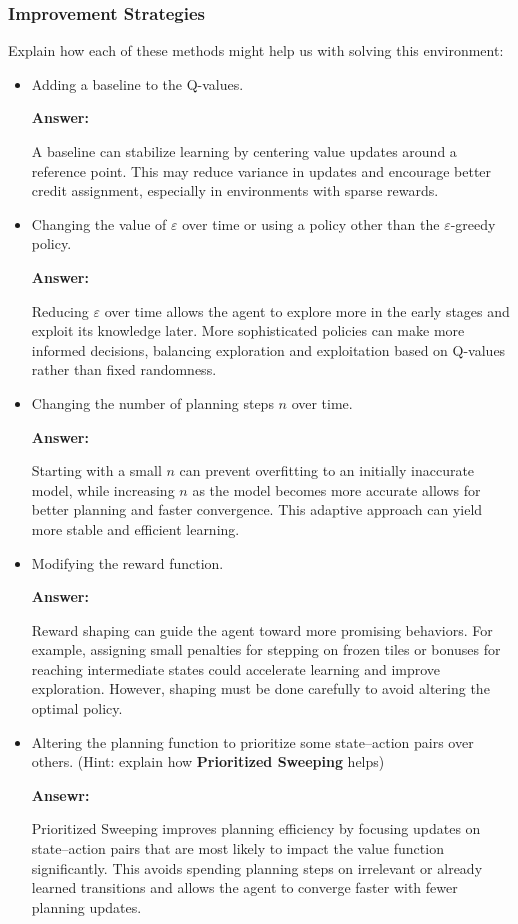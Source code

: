 \vspace*{0.3cm}
\subsubsection{Improvement Strategies}
Explain how each of these methods might help us with solving this environment:
\begin{itemize} 
    \item Adding a baseline to the Q-values. 

    \textbf{Answer:}
    
    A baseline can stabilize learning by centering value updates around a reference point. This may reduce variance in updates and encourage better credit assignment, especially in environments with sparse rewards.


    \item Changing the value of $\varepsilon$ over time or using a policy other than the $\varepsilon$-greedy policy. 

    \textbf{Answer:}
    
    Reducing $\varepsilon$ over time allows the agent to explore more in the early stages and exploit its knowledge later. More sophisticated policies can make more informed decisions, balancing exploration and exploitation based on Q-values rather than fixed randomness.
    
    \item Changing the number of planning steps $n$ over time. 

    \textbf{Answer:}
    
    Starting with a small $n$ can prevent overfitting to an initially inaccurate model, while increasing $n$ as the model becomes more accurate allows for better planning and faster convergence. This adaptive approach can yield more stable and efficient learning.

    \item Modifying the reward function. 

    \textbf{Answer:}
    
    Reward shaping can guide the agent toward more promising behaviors. For example, assigning small penalties for stepping on frozen tiles or bonuses for reaching intermediate states could accelerate learning and improve exploration. However, shaping must be done carefully to avoid altering the optimal policy.

    \item Altering the planning function to prioritize some state–action pairs over others. (Hint: explain how \textbf{Prioritized Sweeping} helps) 

    \textbf{Ansewr:}

    Prioritized Sweeping improves planning efficiency by focusing updates on state–action pairs that are most likely to impact the value function significantly. This avoids spending planning steps on irrelevant or already learned transitions and allows the agent to converge faster with fewer planning updates.

\end{itemize}